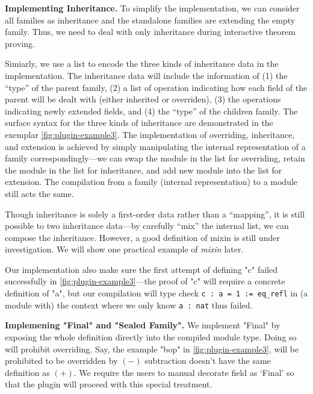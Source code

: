 \textbf{Implementing Inheritance.}
To simplify the implementation, we can consider all families as
inheritance and the standalone families are extending the empty family.
Thus, we need to deal with only inheritance during interactive theorem proving.


Simiarly, we
use a list to encode the three kinds of inheritance data in the
implementation. The inheritance data will include the
information of (1) the ``type'' of the parent family, (2) a list of
operation indicating how each field of the parent will be dealt with
(either inherited or overriden), (3) the operations indicating newly
extended fields, and (4) the ``type'' of the children family.
The surface syntax for the three kinds of inheritance
are demonstrated in the exemplar \cref*{fig:plugin-example3}. The
implementation of overriding, inheritance, and extension is achieved by
simply manipulating the internal representation of a family
correspondingly---we can swap the module in the list for overriding,
retain the module in the list for inheritance, and add new module into
the list for extension. The compilation from a family (internal
representation) to a module still acts the same.

Though inheritance is solely a first-order data rather
than a ``mapping'', it is still possible to
 two inheritance data---by carefully ``mix'' the internal list, we can compose the inheritance. However, a good definition of mixin is still under investigation. We will show one practical example of \textit{mixin} later.

Our implementation also make sure the first attempt of defining "c" failed successfully in \cref{fig:plugin-example3}---the proof of "c" will require a concrete definition of "a",
but our compilation will type check \texttt{c : a = 1 := eq_refl} in (a module with) the context where we only know \texttt{a : nat} thus failed.  



\textbf{Implemening "Final" and "Sealed Family".}
We implement "Final" by
exposing the whole definition directly into the compiled module type. Doing so will prohibit overriding. Say, the example "bop" in \cref{fig:plugin-example3}, will be prohibited to be overridden by $(-)$
subtraction doesn't have the same definition as $(+)$. We require the
users to manual decorate field as `Final' so that the plugin will proceed with this special treatment.


